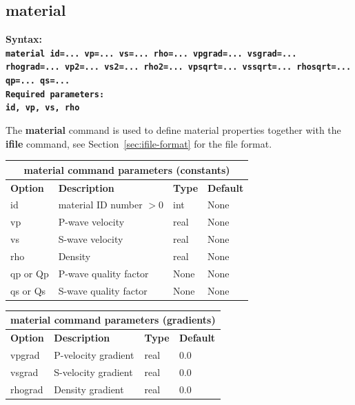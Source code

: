 \documentclass[11pt]{report}
\begin{document}
\subsection{material}
\label{keyword:material}
\begin{flushleft}\bf
Syntax:\\
\tt material
id=... vp=... vs=... rho=... vpgrad=... vsgrad=... rhograd=... vp2=... vs2=... rho2=... vpsqrt=... vssqrt=... rhosqrt=... qp=... qs=...\\ 
\bf Required parameters:\\
\tt id, vp, vs, rho
\end{flushleft}
The {\bf material} command is used to define material properties together with the {\bf ifile}
command, see Section~\ref{sec:ifile-format} for the file format.
\begin{center}
\begin{tabular}{|l|p{8cm}|l|l|} \hline
\multicolumn{4}{|c|}{\bf material command parameters (constants)}\\ \hline
\bf{Option} & \bf{Description} & \bf{Type} & \bf{Default} \\ \hline \hline
id & material ID number $>0$         & int & None  \\ \hline
vp & P-wave velocity & real & None \\ \hline
vs & S-wave velocity & real & None \\ \hline
rho & Density & real & None \\ \hline
qp or Qp & P-wave quality factor & None & None \\ \hline
qs or Qs & S-wave quality factor & None & None \\ \hline
\end{tabular}
\end{center}
\begin{center}
\begin{tabular}{|l|p{8cm}|l|l|} \hline
\multicolumn{4}{|c|}{\bf material command parameters (gradients)}\\ \hline
\bf{Option} & \bf{Description} & \bf{Type} & \bf{Default} \\ \hline \hline
vpgrad & P-velocity gradient & real & 0.0 \\ \hline
vsgrad & S-velocity gradient & real & 0.0 \\ \hline
rhograd & Density gradient   & real & 0.0 \\ \hline
\end{tabular}
\end{center}
\end{document}
